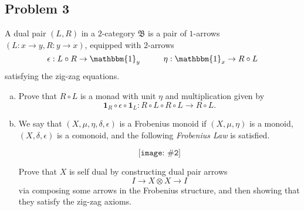 \documentclass{amsart}
\theoremstyle{remark}
\theoremstyle{definition}
\theoremstyle{definition}
\newcommand{\Id}[1]{\mathbbm{1}_{#1}}
\newcommand{\pic}[2]{\texttt{[image: \#2]}}
\begin{document}
\subsection{Problem 3}
A dual pair $(L,R)$ in a $2$-category $\mathfrak{B}$ is a pair of $1$-arrows \mbox{$(L:x\to y,R:y\to x)$}, equipped with $2$-arrows
\[\epsilon: L\circ R\to\Id{y} \hspace{10 mm} \eta:\Id{x}\to R\circ L\]
satisfying the zig-zag equations.
\begin{enumerate}[(a)]
    \item Prove that $R\circ L$ is a monad with unit $\eta$ and multiplication given by
    \[\mathbf{1}_R\circ \epsilon\circ\mathbf{1}_L : R\circ L\circ R\circ L \to R\circ L.\]
    \item We say that $(X,\mu,\eta,\delta,\epsilon)$ is a Frobenius monoid if $(X,\mu,\eta)$ is a monoid, $(X,\delta,\epsilon)$ is a comonoid, and the following \emph{Frobenius Law} is satisfied. 
    
    \[\pic{0.8 in}{frobenius_laws.jpg}\]
    
    \vspace{2 mm}
    
    \noindent Prove that $X$ is self dual by constructing dual pair arrows \[I\to X\otimes X\to I\] via composing some arrows in the Frobenius structure, and then showing that they satisfy the zig-zag axioms.
\end{enumerate}
\end{document}
